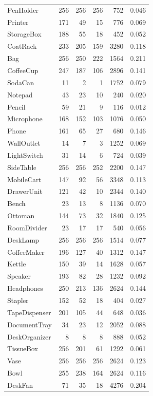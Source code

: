 \begin{longtable}{lrrr r r}
PenHolder & 256 & 256 & 256 & 752 & 0.046 \\
Printer & 171 & 49 & 15 & 776 & 0.069 \\
StorageBox & 188 & 55 & 18 & 452 & 0.052 \\
CoatRack & 233 & 205 & 159 & 3280 & 0.118 \\
Bag & 256 & 250 & 222 & 1564 & 0.211 \\
CoffeeCup & 247 & 187 & 106 & 2896 & 0.141 \\
SodaCan & 11 & 2 & 1 & 1752 & 0.079 \\
Notepad & 43 & 23 & 10 & 240 & 0.020 \\
Pencil & 59 & 21 & 9 & 116 & 0.012 \\
Microphone & 168 & 152 & 103 & 1076 & 0.050 \\
Phone & 161 & 65 & 27 & 680 & 0.146 \\
WallOutlet & 14 & 7 & 3 & 1252 & 0.069 \\
LightSwitch & 31 & 14 & 6 & 724 & 0.039 \\
SideTable & 256 & 256 & 252 & 2200 & 0.147 \\
MobileCart & 147 & 92 & 56 & 3348 & 0.113 \\
DrawerUnit & 121 & 42 & 10 & 2344 & 0.140 \\
Bench & 23 & 13 & 8 & 1136 & 0.070 \\
Ottoman & 144 & 73 & 32 & 1840 & 0.125 \\
RoomDivider & 23 & 17 & 17 & 540 & 0.056 \\
DeskLamp & 256 & 256 & 256 & 1514 & 0.077 \\
CoffeeMaker & 196 & 127 & 40 & 1312 & 0.147 \\
Kettle & 150 & 39 & 14 & 1628 & 0.057 \\
Speaker & 193 & 82 & 28 & 1232 & 0.092 \\
Headphones & 250 & 213 & 136 & 2624 & 0.144 \\
Stapler & 152 & 52 & 18 & 404 & 0.027 \\
TapeDispenser & 201 & 105 & 44 & 648 & 0.036 \\
DocumentTray & 34 & 23 & 12 & 2052 & 0.088 \\
DeskOrganizer & 8 & 8 & 8 & 888 & 0.052 \\
TissueBox & 256 & 201 & 61 & 1292 & 0.061 \\
Vase & 256 & 256 & 256 & 2624 & 0.123 \\
Bowl & 255 & 238 & 164 & 2624 & 0.116 \\
DeskFan & 71 & 35 & 18 & 4276 & 0.204 \\

\end{longtable}
